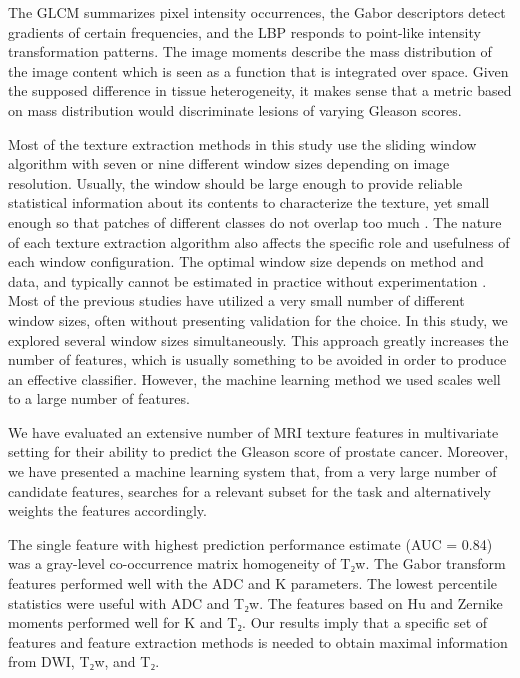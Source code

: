 The GLCM summarizes pixel intensity occurrences, the Gabor descriptors detect
gradients of certain frequencies, and the LBP responds to point-like intensity
transformation patterns. The image moments describe the mass distribution of the
image content which is seen as a function that is integrated over space. Given
the supposed difference in tissue heterogeneity, it makes sense that a metric
based on mass distribution would discriminate lesions of varying Gleason scores.

Most of the texture extraction methods in this study use the sliding window
algorithm with seven or nine different window sizes depending on image
resolution. Usually, the window should be large enough to provide reliable
statistical information about its contents to characterize the texture, yet
small enough so that patches of different classes do not overlap too much
\citep{Haralick1973, Clausi2002Analysis}. The nature of each texture extraction
algorithm also affects the specific role and usefulness of each window
configuration. The optimal window size depends on method and data, and typically
cannot be estimated in practice without experimentation \citep{Puig2001}. Most
of the previous studies have utilized a very small number of different window
sizes, often without presenting validation for the choice. In this study, we
explored several window sizes simultaneously. This approach greatly increases
the number of features, which is usually something to be avoided in order to
produce an effective classifier. However, the machine learning method we used
scales well to a large number of features.

We have evaluated an extensive number of MRI texture features in multivariate
setting for their ability to predict the Gleason score of prostate cancer.
Moreover, we have presented a machine learning system that, from a very large
number of candidate features, searches for a relevant subset for the task and
alternatively weights the features accordingly.

The single feature with highest
prediction performance estimate (AUC = 0.84) was a gray-level co-occurrence
matrix homogeneity of T₂w. The Gabor transform features performed well with the
ADC and K parameters. The lowest percentile statistics were useful with ADC and
T₂w. The features based on Hu and Zernike moments performed well for K and T₂.
Our results imply that a specific set of features and feature extraction methods
is needed to obtain maximal information from DWI, T₂w, and T₂.

